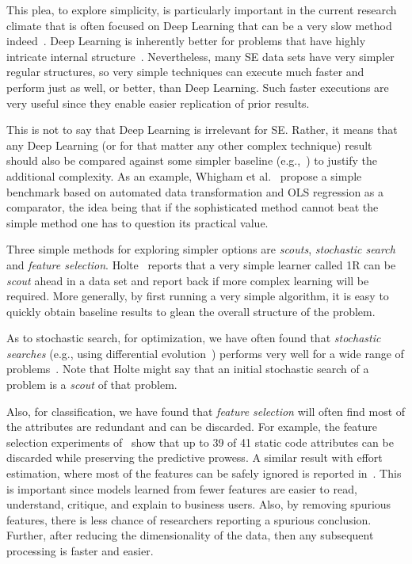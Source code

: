 \documentclass[10pt]{elsarticle}
\begin{document}
This plea, to explore simplicity, is particularly important in the current research climate that is often focused on  Deep Learning that can be a very slow method indeed~\cite{fu2017easy}. Deep Learning is inherently better for problems that have highly intricate internal structure~\cite{lecun2015deep}. Nevertheless, many SE data sets have very simpler regular structures, so very simple techniques can execute much faster and perform just as well, or better, than Deep Learning. Such faster executions are very useful since they enable easier replication of prior results.

This is not to say that Deep Learning is irrelevant for SE. Rather, it means that any Deep Learning (or for that matter any other complex technique) result should also be compared against some simpler baseline (e.g.,~\cite{fu2017}) to justify the additional complexity.  As an example, Whigham et al.~\cite{Whig15} propose a simple benchmark based on automated data transformation and OLS regression as a comparator, the idea being that if the sophisticated method cannot beat the simple method one has to question its practical value.

Three simple methods for exploring simpler options are {\em scouts}, {\em stochastic search} and {\em feature selection}. Holte~\cite{Holte1993} reports that a very simple learner called 1R can be {\em scout} ahead in a data set and report back if more complex learning will be required. More generally, by first running a very simple algorithm, it is easy to quickly obtain baseline results to glean the overall structure of the problem.

As to stochastic search, for optimization, we have often found that {\em stochastic searches} (e.g., using differential evolution~\cite{Storn1997}) performs very well for a wide range of problems~\cite{fu2016, agrawal16, agrawal18}.  Note that Holte might say that an initial stochastic search of a problem is a {\em scout} of that problem.

Also, for classification, we have found that {\em feature selection} will often find most of the attributes are redundant and can be discarded.  For example, the feature selection experiments of~\cite{menzies07} show that up to 39 of 41 static code attributes can be discarded while preserving the predictive prowess. A similar result with effort estimation, where most of the features can be safely ignored is reported in~\cite{chen2005}. This is important since models learned from fewer features are easier to read, understand, critique, and explain to business users. Also, by removing spurious features, there is less chance of researchers reporting a spurious conclusion. Further, after reducing the dimensionality of the data, then any subsequent processing is faster and easier.
\end{document}
